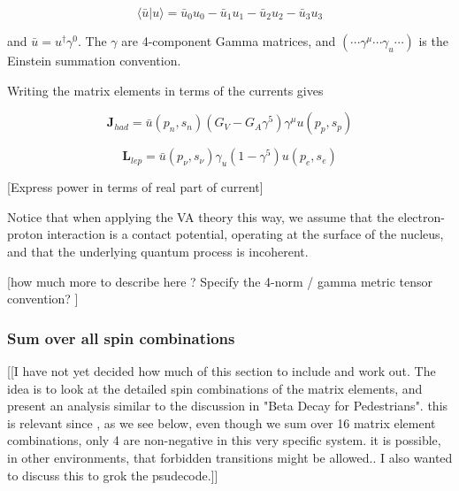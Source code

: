 \documentclass[%
 aip,
 jmp,%
 amsmath,amssymb,
 reprint,%
]{revtex4-1}
\begin{document}
$$\langle\bar{u}|u\rangle=\bar{u}_{0}u_{0}-\bar{u}_{1}u_{1}-\bar{u}_{2}u_{2}-\bar{u}_{3}u_{3}$$

and $\bar{u}=u^{\dagger}\gamma^{0}$.  The $\gamma$ are 4-component Gamma matrices, and  $(\cdots\gamma^{\mu}\cdots\gamma_{u}\cdots)$ is the Einstein summation convention. 

Writing the matrix elements in terms of the currents gives

$$\mathbf{J}_{had}=\bar{u}(p_{n},s_{n})(G_{V}-G_{A}\gamma^{5})\gamma^{\mu}u(p_{p},s_{p})$$

$$\mathbf{L}_{lep}=\bar{u}(p_{\nu},s_{\nu})\gamma_{u}(1-\gamma^{5})u(p_{e},s_{e})$$

[Express power in terms of real part of current]

Notice that when applying the VA theory this way, we assume that the electron-proton interaction is a contact potential, operating at the surface of the nucleus, and that the underlying quantum process is incoherent.  

[how much more to describe here ?  Specify the 4-norm / gamma metric tensor convention? ]


\subsubsection{Sum over all spin combinations}

[[I have not yet decided how much of this section to include and work out.  The idea is to look at the detailed spin combinations of the matrix elements, and present an analysis similar to the discussion in "Beta Decay for Pedestrians".  this is relevant since , as we see below, even though we sum over 16 matrix element combinations, only 4 are non-negative in this very specific system.  it is possible, in other environments, that forbidden transitions might be allowed.. I also wanted to discuss this to grok the psudecode.]]  
\end{document}
